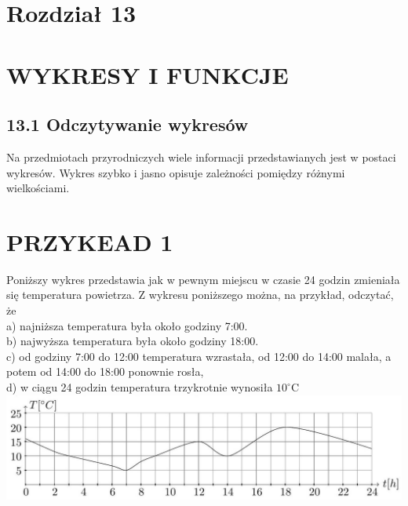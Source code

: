 \documentclass[10pt]{article}
\begin{document}
\section*{Rozdział 13}
\section*{WYKRESY I FUNKCJE}
\subsection*{13.1 Odczytywanie wykresów}
Na przedmiotach przyrodniczych wiele informacji przedstawianych jest w postaci wykresów. Wykres szybko i jasno opisuje zależności pomiędzy różnymi wielkościami.

\section*{PRZYKEAD 1}
Poniższy wykres przedstawia jak w pewnym miejscu w czasie 24 godzin zmieniała się temperatura powietrza. Z wykresu poniższego można, na przykład, odczytać, że\\
a) najniższa temperatura była około godziny 7:00.\\
b) najwyższa temperatura była około godziny 18:00.\\
c) od godziny 7:00 do 12:00 temperatura wzrastała, od 12:00 do 14:00 malała, a potem od 14:00 do 18:00 ponownie rosła,\\
d) w ciągu 24 godzin temperatura trzykrotnie wynosiła \(10^{\circ} \mathrm{C}\)\\
\includegraphics[max width=\textwidth, center]{2024_11_21_e9b4faa005d5be2cc318g-116}
\end{document}
